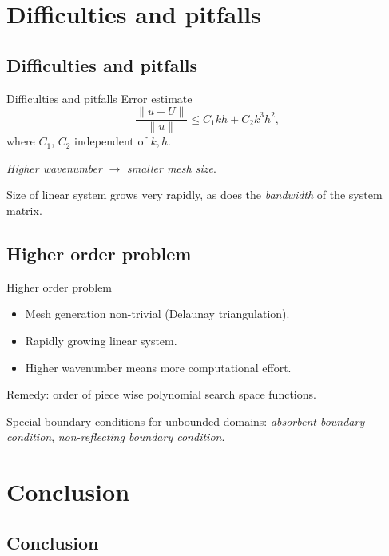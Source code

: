 \documentclass[]{beamer}
\begin{document}
\section{Difficulties and pitfalls}
\subsection{Difficulties and pitfalls}
\begin{frame}{Difficulties and pitfalls}
Error estimate
\begin{equation*} \label{eq:ErrEst}
  \frac{\lVert u - U \rVert}{\lVert u \rVert} \leq C_1 k h + C_2 k^3
  h^2,
\end{equation*}
where $C_1$, $C_2$ independent of $k, h$.

\medskip
\begin{center}
  
\emph{Higher wavenumber} $\rightarrow$ \emph{smaller mesh size}.
\end{center}
\medskip
Size of linear system grows very rapidly, as does the \emph{bandwidth}
of the system matrix.
\end{frame}

\subsection{Higher order problem}
\begin{frame}{Higher order problem}
  \begin{itemize}
    \item Mesh generation non-trivial (Delaunay triangulation).
    \item Rapidly growing linear system.
    \item Higher wavenumber means more computational effort.
  \end{itemize}

  Remedy: order of piece wise polynomial search space functions.

  \medskip
  Special boundary conditions for unbounded domains: \emph{absorbent boundary condition},
  \emph{non-reflecting boundary condition}.
\end{frame}

\section{Conclusion}

\subsection{Conclusion}
\end{document}
